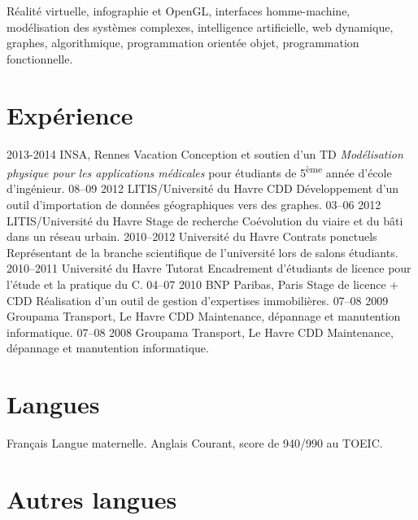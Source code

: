 \documentclass[]{friggeri-cv}
\begin{document}
Réalité virtuelle, infographie et OpenGL, interfaces homme-machine, modélisation des systèmes complexes, intelligence artificielle, web dynamique, graphes, algorithmique, programmation orientée objet, programmation fonctionnelle.

\section{Expérience}

\begin{entrylist}
  \entry
    {2013-2014}
    {INSA, Rennes}
    {Vacation}
    {Conception et soutien d'un TD \textit{Modélisation physique pour les applications médicales} pour étudiants de 5\textsuperscript{ème} année d'école d'ingénieur.}
  \entry
    {08–09 2012}
    {LITIS/Université du Havre}
    {CDD}
    {Développement d'un outil d'importation de données géographiques vers des graphes.}
  \entry
    {03–06 2012}
    {LITIS/Université du Havre}
    {Stage de recherche}
    {Coévolution du viaire et du bâti dans un réseau urbain.}
  \entry
    {2010–2012}
    {Université du Havre}
    {Contrats ponctuels}
    {Représentant de la branche scientifique de l'université
      lors de salons étudiants.}
  \entry
    {2010–2011}
    {Université du Havre}
    {Tutorat}
    {Encadrement d'étudiants de licence pour l'étude et la pratique du
    C.}
  \entry
    {04–07 2010}
    {BNP Paribas, Paris}
    {Stage de licence + CDD}
    {Réalisation d'un outil de gestion d'expertises immobilières.}
  \entry
    {07–08 2009}
    {Groupama Transport, Le Havre}
    {CDD}
    {Maintenance, dépannage et manutention informatique.}
  \entry
    {07–08 2008}
    {Groupama Transport, Le Havre}
    {CDD}
    {Maintenance, dépannage et manutention informatique.}
\end{entrylist}

\newpage

\section{Langues}

\begin{entrylist}
  \entry
    {}
    {Français}
    {}
    {Langue maternelle.}
  \entry
    {}
    {Anglais}
    {}
    {Courant, score de 940/990 au TOEIC.}
\end{entrylist}

\section{Autres langues}
\end{document}
